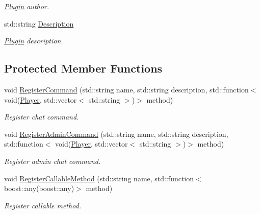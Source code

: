 \begin{DoxyCompactItemize}
\begin{DoxyCompactList}\small\item\em \hyperlink{classPlugin}{Plugin} author. \end{DoxyCompactList}\item 
\hypertarget{classPlugin_a6193c45b6440160ae79db041f71647c2}{std\-::string \hyperlink{classPlugin_a6193c45b6440160ae79db041f71647c2}{Description}}\label{classPlugin_a6193c45b6440160ae79db041f71647c2}

\begin{DoxyCompactList}\small\item\em \hyperlink{classPlugin}{Plugin} description. \end{DoxyCompactList}\end{DoxyCompactItemize}
\subsection*{Protected Member Functions}
\begin{DoxyCompactItemize}
\item 
void \hyperlink{classPlugin_a9e5eea29a253fc24459011c55cb0a8ff}{Register\-Command} (std\-::string name, std\-::string description, std\-::function$<$ void(\hyperlink{structPlayer}{Player}, std\-::vector$<$ std\-::string $>$)$>$ method)
\begin{DoxyCompactList}\small\item\em Register chat command. \end{DoxyCompactList}\item 
void \hyperlink{classPlugin_ac475431998fe527b1c9671acbb6dbe1d}{Register\-Admin\-Command} (std\-::string name, std\-::string description, std\-::function$<$ void(\hyperlink{structPlayer}{Player}, std\-::vector$<$ std\-::string $>$)$>$ method)
\begin{DoxyCompactList}\small\item\em Register admin chat command. \end{DoxyCompactList}\item 
void \hyperlink{classPlugin_a3c053c7efbed950494f16fc91228e7fd}{Register\-Callable\-Method} (std\-::string name, std\-::function$<$ boost\-::any(boost\-::any)$>$ method)
\begin{DoxyCompactList}\small\item\em Register callable method. \end{DoxyCompactList}\end{DoxyCompactItemize}
